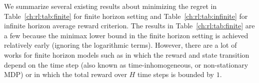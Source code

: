 We summarize several existing results about minimizing the regret in Table~\ref{ch:rl:tab:finite} for finite horizon setting and Table~\ref{ch:rl:tab:infinite} for infinite horizon average reward criterion.
The results in Table~\ref{ch:rl:tab:finite} are a few because the minimax lower bound in the finite horizon setting is achieved relatively early (ignoring the logarithmic terms).
However, there are a lot of works for finite horizon models such as  \cite{jin2018q, domingues2021episodic, li2021breaking} in which the reward and state transition depend on the time step (also known as time-inhomogeneous, or non-stationary MDP) or \cite{zanette2019tighter, zhang2021reinforcement} in which the total reward over $H$ time steps is bounded by $1$.

